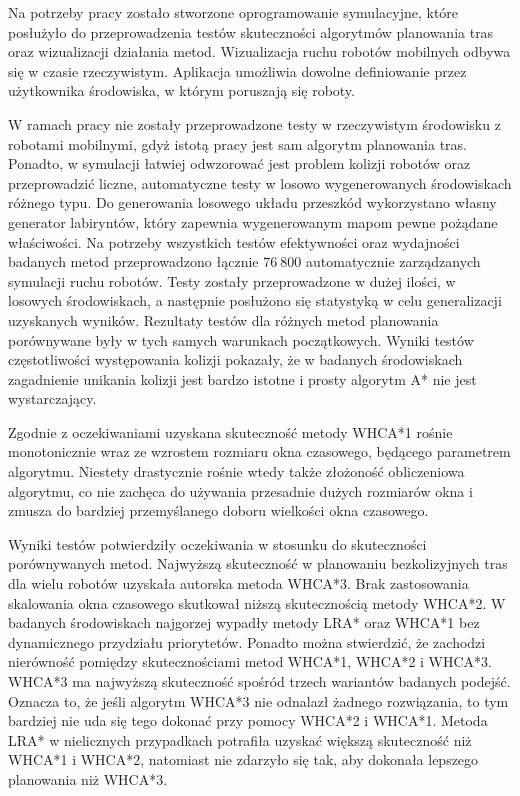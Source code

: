 Na potrzeby pracy zostało stworzone oprogramowanie symulacyjne, które posłużyło do przeprowadzenia testów skuteczności algorytmów planowania tras oraz wizualizacji działania metod.
Wizualizacja ruchu robotów mobilnych odbywa się w czasie rzeczywistym.
Aplikacja umożliwia dowolne definiowanie przez użytkownika środowiska, w którym poruszają się roboty.

W ramach pracy nie zostały przeprowadzone testy w rzeczywistym środowisku z robotami mobilnymi, gdyż istotą pracy jest sam algorytm planowania tras.
Ponadto, w symulacji łatwiej odwzorować jest problem kolizji robotów oraz przeprowadzić liczne, automatyczne testy w losowo wygenerowanych środowiskach różnego typu.
Do generowania losowego układu przeszkód wykorzystano własny generator labiryntów, który zapewnia wygenerowanym mapom pewne pożądane właściwości.
Na potrzeby wszystkich testów efektywności oraz wydajności badanych metod przeprowadzono łącznie $76\ 800$ automatycznie zarządzanych symulacji ruchu robotów.
Testy zostały przeprowadzone w dużej ilości, w losowych środowiskach, a następnie posłużono się statystyką w celu generalizacji uzyskanych wyników.
Rezultaty testów dla różnych metod planowania porównywane były w tych samych warunkach początkowych.
Wyniki testów częstotliwości występowania kolizji pokazały, że w badanych środowiskach zagadnienie unikania kolizji jest bardzo istotne i prosty algorytm A* nie jest wystarczający.

Zgodnie z oczekiwaniami uzyskana skuteczność metody WHCA*1 rośnie monotonicznie wraz ze wzrostem rozmiaru okna czasowego, będącego parametrem algorytmu.
Niestety drastycznie rośnie wtedy także złożoność obliczeniowa algorytmu, co nie zachęca do używania przesadnie dużych rozmiarów okna i zmusza do bardziej przemyślanego doboru wielkości okna czasowego.

Wyniki testów potwierdziły oczekiwania w stosunku do skuteczności porównywanych metod.
Najwyższą skuteczność w planowaniu bezkolizyjnych tras dla wielu robotów uzyskała autorska metoda WHCA*3.
Brak zastosowania skalowania okna czasowego skutkował niższą skutecznością metody WHCA*2.
W badanych środowiskach najgorzej wypadły metody LRA* oraz WHCA*1 bez dynamicznego przydziału priorytetów.
Ponadto można stwierdzić, że zachodzi nierówność pomiędzy skutecznościami metod WHCA*1, WHCA*2 i WHCA*3.
WHCA*3 ma najwyższą skuteczność spośród trzech wariantów badanych podejść.
Oznacza to, że jeśli algorytm WHCA*3 nie odnalazł żadnego rozwiązania, to tym bardziej nie uda się tego dokonać przy pomocy WHCA*2 i WHCA*1.
Metoda LRA* w nielicznych przypadkach potrafiła uzyskać większą skuteczność niż WHCA*1 i WHCA*2, natomiast nie zdarzyło się tak, aby dokonała lepszego planowania niż WHCA*3.


